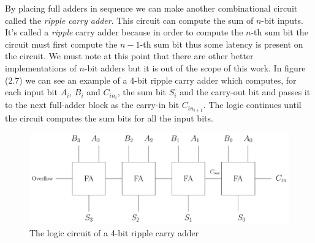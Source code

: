 By placing full adders in sequence we can make another combinational circuit
called the \textit{ripple carry adder}. This circuit can compute the sum
of $n$-bit inputs. It's called a \textit{ripple} carry adder because in order
to compute the $n$-th sum bit the circuit must first compute the $n-1$-th
sum bit thus some latency is present on the circuit. We must note at this point
that there are other better implementations of $n$-bit adders but it is out of
the scope of this work. In figure (2.7) we can see an example of a 4-bit
ripple carry adder which computes, for each input bit $A_i$, $B_i$ and $C_{in_i}$,
the sum bit $S_i$ and the carry-out bit and passes it to the next full-adder block as
the carry-in bit $C_{in_{i+1}}$. The logic continues until the circuit computes the sum bits for
all the input bits.

\begin{figure}[ht]
    \centering
    \includegraphics[width=14cm]{images/2_Classical_Computing/ripple_carry_adder.pdf}
    \caption{The logic circuit of a 4-bit ripple carry adder}
\end{figure}